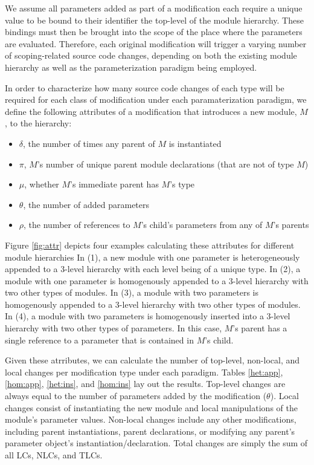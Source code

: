 We assume all parameters added as part of a modification each require a unique value to be bound to their identifier the top-level of the module hierarchy.
These bindings must then be brought into the scope of the place where the parameters are evaluated.
Therefore, each original modification will trigger a varying number of scoping-related source code changes,
depending on both the existing module hierarchy as well as the parameterization paradigm being employed.

In order to characterize how many source code changes of each type will be required for each class of modification under each paramaterization paradigm,
we define the following attributes of a modification that introduces a new module, $M$, to the hierarchy:
\begin{itemize}%
\item $\delta$, the number of times any parent of $M$ is instantiated
\item $\pi$, $M$'s number of unique parent module declarations (that are not of type $M$)
\item $\mu$, whether $M$'s immediate parent has $M$'s type
\item $\theta$, the number of added parameters
\item $\rho$, the number of references to $M$'s child's parameters from any of $M$'s parents
\end{itemize}

Figure \ref{fig:attr} depicts four examples calculating these attributes for different module hierarchies
In (1), a new module with one parameter is heterogeneously appended to a 3-level hierarchy with each level being of a unique type.
In (2), a module with one parameter is homogenously appended to a 3-level hierarchy with two other types of modules.
In (3), a module with two parameters is homogenously appended to a 3-level hierarchy with two other types of modules.
In (4), a module with two parameters is homogenously inserted into a 3-level hierarchy with two other types of parameters.
In this case, $M$'s parent has a single reference to a parameter that is contained in $M$'s child.

Given these atrributes, we can calculate the number of top-level, non-local, and local changes per modification type under each paradigm.
Tables \ref{het:app}, \ref{hom:app}, \ref{het:ins}, and \ref{hom:ins} lay out the results.
Top-level changes are always equal to the number of parameters added by the modification ($\theta$).
Local changes consist of instantiating the new module and local manipulations of the module's parameter values.
Non-local changes include any other modifications, including parent instantiations, parent declarations, or modifying any parent's parameter object's instantiation/declaration.
Total changes are simply the sum of all LCs, NLCs, and TLCs.

